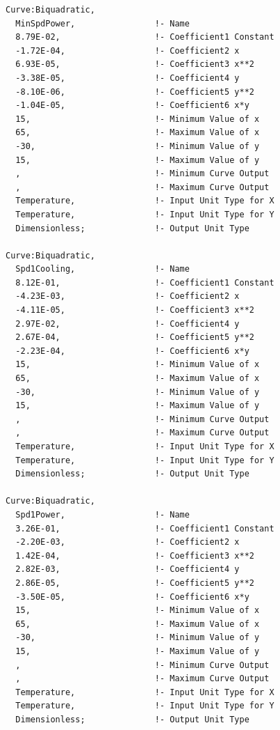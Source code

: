 \begin{lstlisting}
Curve:Biquadratic,
  MinSpdPower,                !- Name
  8.79E-02,                   !- Coefficient1 Constant
  -1.72E-04,                  !- Coefficient2 x
  6.93E-05,                   !- Coefficient3 x**2
  -3.38E-05,                  !- Coefficient4 y
  -8.10E-06,                  !- Coefficient5 y**2
  -1.04E-05,                  !- Coefficient6 x*y
  15,                         !- Minimum Value of x
  65,                         !- Maximum Value of x
  -30,                        !- Minimum Value of y
  15,                         !- Maximum Value of y
  ,                           !- Minimum Curve Output
  ,                           !- Maximum Curve Output
  Temperature,                !- Input Unit Type for X
  Temperature,                !- Input Unit Type for Y
  Dimensionless;              !- Output Unit Type

Curve:Biquadratic,
  Spd1Cooling,                !- Name
  8.12E-01,                   !- Coefficient1 Constant
  -4.23E-03,                  !- Coefficient2 x
  -4.11E-05,                  !- Coefficient3 x**2
  2.97E-02,                   !- Coefficient4 y
  2.67E-04,                   !- Coefficient5 y**2
  -2.23E-04,                  !- Coefficient6 x*y
  15,                         !- Minimum Value of x
  65,                         !- Maximum Value of x
  -30,                        !- Minimum Value of y
  15,                         !- Maximum Value of y
  ,                           !- Minimum Curve Output
  ,                           !- Maximum Curve Output
  Temperature,                !- Input Unit Type for X
  Temperature,                !- Input Unit Type for Y
  Dimensionless;              !- Output Unit Type

Curve:Biquadratic,
  Spd1Power,                  !- Name
  3.26E-01,                   !- Coefficient1 Constant
  -2.20E-03,                  !- Coefficient2 x
  1.42E-04,                   !- Coefficient3 x**2
  2.82E-03,                   !- Coefficient4 y
  2.86E-05,                   !- Coefficient5 y**2
  -3.50E-05,                  !- Coefficient6 x*y
  15,                         !- Minimum Value of x
  65,                         !- Maximum Value of x
  -30,                        !- Minimum Value of y
  15,                         !- Maximum Value of y
  ,                           !- Minimum Curve Output
  ,                           !- Maximum Curve Output
  Temperature,                !- Input Unit Type for X
  Temperature,                !- Input Unit Type for Y
  Dimensionless;              !- Output Unit Type


\end{lstlisting}
